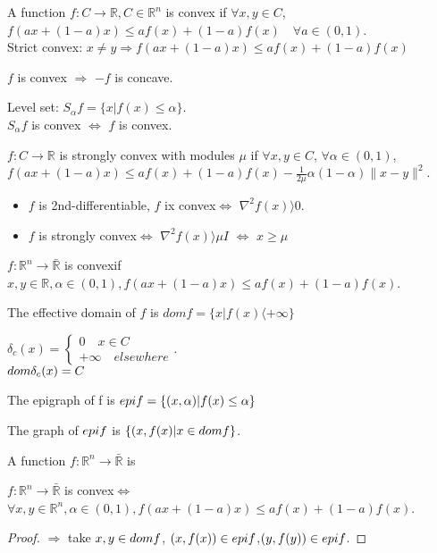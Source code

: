 \documentclass[11pt,fleqn]{book} %
\def\R{\mathbb{R}}
\newcommand{\cvx}{convex}
\begin{document}
\begin{definition}
A function $f : C \rightarrow \R, C \in \R^n$ is convex if $\forall x, y \in C$, $f(ax + (1-a)x) \le af(x) + (1-a)f(x) \quad \forall a \in (0,1)$.\\ 
Strict convex: $x \neq y \Rightarrow f(ax + (1-a)x) \le af(x) + (1-a)f(x) $
\end{definition}
\begin{remark}
$f$ is convex $\Rightarrow$ $-f$ is concave.
\end{remark}
Level set: $S_{\alpha}f = \{ x | f(x) \le \alpha \}$.\\ 
$S_{\alpha}f$ is convex $\Leftrightarrow$ $f$ is convex. \\
\begin{definition}
$f : C \rightarrow \R$ is strongly convex with modules $\mu$ if $\forall x, y \in C$, $\forall \alpha \in (0,1)$, $f(ax + (1-a)x) \le af(x) + (1-a)f(x) - \frac{1}{2\mu}\alpha(1- \alpha) \|x-y\|^2$.
\end{definition}

\begin{remark}
\begin{itemize}
\item $f$ is 2nd-differentiable, $f$ ix \cvx $\iff$ $\nabla^2f(x) \rangle  0$.
\item $f$ is strongly \cvx $\iff$ $\nabla^2f(x) \rangle  \mu I$ $\iff$ $x \ge \mu$
\end{itemize}
\end{remark}
\begin{definition}[2]
$f : \R^n \to \bar{\R} $ is \cvx  if $x, y  \in \R , \alpha \in (0,1), f(ax + (1-a)x) \le af(x) + (1-a)f(x)$.  
\end{definition}
The effective domain of $f$ is $dom f = \{x | f(x) \langle + \infty \}$ 
\begin{example}
$\delta_c(x) = \begin{cases}
0 \quad  x \in C \\
+ \infty \quad elsewhere
\end{cases}$.\\
$dom \space \delta_c(x) = C$
\end{example}
\begin{definition}[Epigraph]
The epigraph of f is $epi \space f = \{(x,\alpha) | f(x) \le \alpha\}$
\end{definition}
The graph of $epi \space f$ is $\{ (x,f(x) | x \in dom \space f\}$.
\begin{definition}[III]
A function $f : \R^n \to \bar{\R}$ is %
\end{definition}
\begin{theorem}
$f : \R^n \to \bar{\R}$ is \cvx  $\iff$ $\forall x,y \in \R^n, \alpha \in (0,1), f(ax + (1-a)x) \le af(x) + (1-a)f(x)$.
\end{theorem}
\begin{proof}
$\Rightarrow$ take $x,y \in dom \space f$, $(x,f(x)) \in epi \space f$,$(y,f(y)) \in epi \space f$.
\end{proof}
\end{document}
